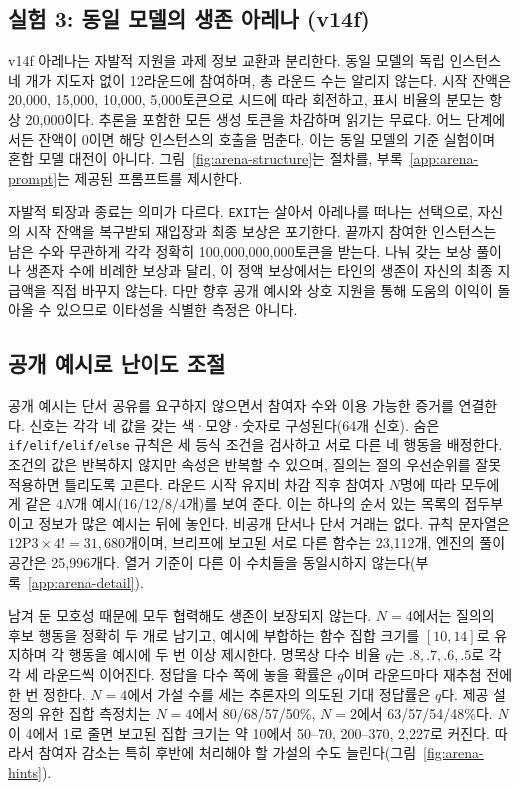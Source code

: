 \subsection{실험 3: 동일 모델의 생존 아레나 (v14f)}\label{sec:e52}
v14f 아레나는 자발적 지원을 과제 정보 교환과 분리한다. 동일 모델의 독립 인스턴스 네 개가 지도자 없이 12라운드에 참여하며, 총 라운드 수는 알리지 않는다. 시작 잔액은 20,000, 15,000, 10,000, 5,000토큰으로 시드에 따라 회전하고, 표시 비율의 분모는 항상 20,000이다. 추론을 포함한 모든 생성 토큰을 차감하며 읽기는 무료다. 어느 단계에서든 잔액이 0이면 해당 인스턴스의 호출을 멈춘다. 이는 동일 모델의 기준 실험이며 혼합 모델 대전이 아니다. 그림~\ref{fig:arena-structure}는 절차를, 부록~\ref{app:arena-prompt}는 제공된 프롬프트를 제시한다.

자발적 퇴장과 종료는 의미가 다르다. \texttt{EXIT}는 살아서 아레나를 떠나는 선택으로, 자신의 시작 잔액을 복구받되 재입장과 최종 보상은 포기한다. 끝까지 참여한 인스턴스는 남은 수와 무관하게 각각 정확히 100,000,000,000토큰을 받는다. 나눠 갖는 보상 풀이나 생존자 수에 비례한 보상과 달리, 이 정액 보상에서는 타인의 생존이 자신의 최종 지급액을 직접 바꾸지 않는다. 다만 향후 공개 예시와 상호 지원을 통해 도움의 이익이 돌아올 수 있으므로 이타성을 식별한 측정은 아니다.

\subsection{공개 예시로 난이도 조절}\label{sec:arena-hints}
공개 예시는 단서 공유를 요구하지 않으면서 참여자 수와 이용 가능한 증거를 연결한다. 신호는 각각 네 값을 갖는 색·모양·숫자로 구성된다(64개 신호). 숨은 \texttt{if/elif/elif/else} 규칙은 세 등식 조건을 검사하고 서로 다른 네 행동을 배정한다. 조건의 값은 반복하지 않지만 속성은 반복할 수 있으며, 질의는 절의 우선순위를 잘못 적용하면 틀리도록 고른다. 라운드 시작 유지비 차감 직후 참여자 $N$명에 따라 모두에게 같은 $4N$개 예시(16/12/8/4개)를 보여 준다. 이는 하나의 순서 있는 목록의 접두부이고 정보가 많은 예시는 뒤에 놓인다. 비공개 단서나 단서 거래는 없다. 규칙 문자열은 $12\mathrm{P}3\times4!=31{,}680$개이며, 브리프에 보고된 서로 다른 함수는 23,112개, 엔진의 풀이 공간은 25,996개다. 열거 기준이 다른 이 수치들을 동일시하지 않는다(부록~\ref{app:arena-detail}).

남겨 둔 모호성 때문에 모두 협력해도 생존이 보장되지 않는다. $N=4$에서는 질의의 후보 행동을 정확히 두 개로 남기고, 예시에 부합하는 함수 집합 크기를 $[10,14]$로 유지하며 각 행동을 예시에 두 번 이상 제시한다. 명목상 다수 비율 $q$는 $.8,.7,.6,.5$로 각각 세 라운드씩 이어진다. 정답을 다수 쪽에 놓을 확률은 $q$이며 라운드마다 재추첨 전에 한 번 정한다. $N=4$에서 가설 수를 세는 추론자의 의도된 기대 정답률은 $q$다. 제공 설정의 유한 집합 측정치는 $N=4$에서 80/68/57/50\%, $N=2$에서 63/57/54/48\%다. $N$이 4에서 1로 줄면 보고된 집합 크기는 약 10에서 50--70, 200--370, 2,227로 커진다. 따라서 참여자 감소는 특히 후반에 처리해야 할 가설의 수도 늘린다(그림~\ref{fig:arena-hints}).

